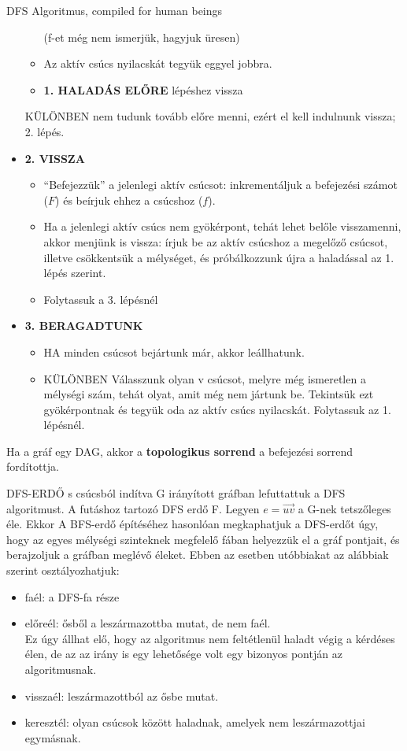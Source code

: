 \begin{tetel}{DFS Algoritmus, compiled for human beings}
\begin{itemize}
\begin{itemize}
    (f-et még nem ismerjük, hagyjuk üresen)

  \item Az aktív csúcs nyilacskát tegyük eggyel jobbra.

	\item \textbf{1. HALADÁS ELŐRE} lépéshez vissza
	\end{itemize}
    KÜLÖNBEN nem tudunk tovább előre menni, ezért el kell indulnunk vissza; 2. lépés.
\item{\textbf{2. VISSZA}}
  \begin{itemize}
  \item ``Befejezzük'' a jelenlegi aktív csúcsot: inkrementáljuk a befejezési számot ($F$) és beírjuk ehhez a csúcshoz ($f$).
  \item Ha a jelenlegi aktív csúcs nem gyökérpont, tehát lehet belőle visszamenni, akkor menjünk is vissza: írjuk be az aktív csúcshoz a megelőző csúcsot, illetve csökkentsük a mélységet, és próbálkozzunk újra a haladással az 1. lépés szerint.
  \item Folytassuk a 3. lépésnél
  \end{itemize}
\item \textbf{3. BERAGADTUNK}
  \begin{itemize}
  \item HA minden csúcsot bejártunk már, akkor leállhatunk.
  \item KÜLÖNBEN Válasszunk olyan v csúcsot, melyre még ismeretlen a mélységi szám, tehát olyat, amit még nem jártunk be. Tekintsük ezt gyökérpontnak és tegyük oda az aktív csúcs nyilacskát. Folytassuk az 1. lépésnél.
  \end{itemize}
\end{itemize}

Ha a gráf egy DAG, akkor a \textbf{topologikus sorrend} a befejezési sorrend fordítottja.
\end{tetel}

\begin{definicio}{DFS-ERDŐ}
s csúcsból indítva G irányított gráfban lefuttattuk a DFS algoritmust. A futáshoz tartozó DFS erdő F. Legyen $e=\overrightarrow{uv}$ a G-nek tetszőleges éle. Ekkor
A BFS-erdő építéséhez hasonlóan megkaphatjuk a DFS-erdőt úgy, hogy az egyes mélységi szinteknek megfelelő fában helyezzük el a gráf pontjait, és berajzoljuk a gráfban meglévő éleket. Ebben az esetben utóbbiakat az alábbiak szerint osztályozhatjuk:
\begin{itemize}
\item faél: a DFS-fa része
\item előreél: ősből a leszármazottba mutat, de nem faél.\\
  Ez úgy állhat elő, hogy az algoritmus nem feltétlenül haladt végig a kérdéses élen, de az az irány is egy lehetősége volt egy bizonyos pontján az algoritmusnak.
\item visszaél: leszármazottból az ősbe mutat.
\item keresztél: olyan csúcsok között haladnak, amelyek nem leszármazottjai egymásnak.
\end{itemize}
\end{definicio}

